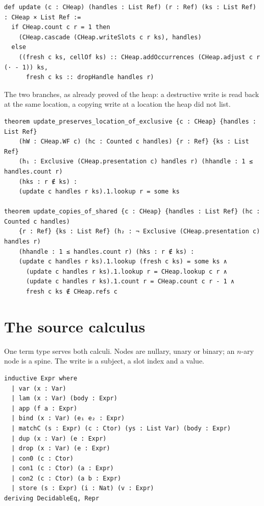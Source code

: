 \documentclass[11pt]{article}
\theoremstyle{remark}
\begin{document}
\begin{lstlisting}
def update (c : CHeap) (handles : List Ref) (r : Ref) (ks : List Ref) : CHeap × List Ref :=
  if CHeap.count c r = 1 then
    (CHeap.cascade (CHeap.writeSlots c r ks), handles)
  else
    ((fresh c ks, cellOf ks) :: CHeap.addOccurrences (CHeap.adjust c r (· - 1)) ks,
      fresh c ks :: dropHandle handles r)
\end{lstlisting}

\noindent The two branches, as already proved of the heap: a destructive write is
read back at the same location, a copying write at a location the heap did not list.

\begin{lstlisting}
theorem update_preserves_location_of_exclusive {c : CHeap} {handles : List Ref}
    (hW : CHeap.WF c) (hc : Counted c handles) {r : Ref} {ks : List Ref}
    (h₁ : Exclusive (CHeap.presentation c) handles r) (hhandle : 1 ≤ handles.count r)
    (hks : r ∉ ks) :
    (update c handles r ks).1.lookup r = some ks

theorem update_copies_of_shared {c : CHeap} {handles : List Ref} (hc : Counted c handles)
    {r : Ref} {ks : List Ref} (h₂ : ¬ Exclusive (CHeap.presentation c) handles r)
    (hhandle : 1 ≤ handles.count r) (hks : r ∉ ks) :
    (update c handles r ks).1.lookup (fresh c ks) = some ks ∧
      (update c handles r ks).1.lookup r = CHeap.lookup c r ∧
      (update c handles r ks).1.count r = CHeap.count c r - 1 ∧
      fresh c ks ∉ CHeap.refs c
\end{lstlisting}

\section{The source calculus}
\label{sec:source}

\noindent One term type serves both calculi. Nodes are nullary, unary or binary; an
$n$-ary node is a spine. The write is a subject, a slot index and a value.

\begin{lstlisting}
inductive Expr where
  | var (x : Var)
  | lam (x : Var) (body : Expr)
  | app (f a : Expr)
  | bind (x : Var) (e₁ e₂ : Expr)
  | matchC (s : Expr) (c : Ctor) (ys : List Var) (body : Expr)
  | dup (x : Var) (e : Expr)
  | drop (x : Var) (e : Expr)
  | con0 (c : Ctor)
  | con1 (c : Ctor) (a : Expr)
  | con2 (c : Ctor) (a b : Expr)
  | store (s : Expr) (i : Nat) (v : Expr)
deriving DecidableEq, Repr
\end{lstlisting}
\end{document}
